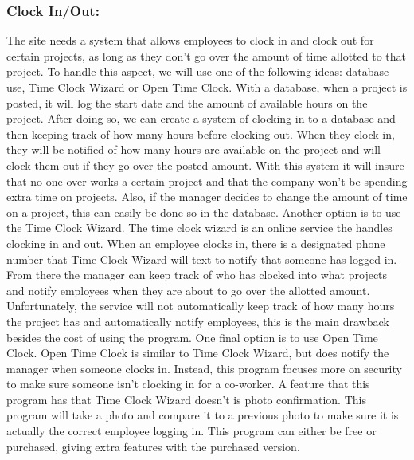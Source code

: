 \documentclass[letterpaper,10pt,titlepage,journal,compsoc,draftclsnofoot,onecolumn]{IEEEtran}
\newcommand\tab[1][1cm]{\hspace*{#1}}
\begin{document}
\subsubsection{Clock In/Out:}
\tab The site needs a system that allows employees to clock in and clock out for certain projects, as long as they don’t go over the amount of time allotted to that project. To handle this aspect, we will use one of the following ideas: database use, Time Clock Wizard or Open Time Clock. \newline\newline\tab With a database, when a project is posted, it will log the start date and the amount of available hours on the project. After doing so, we can create a system of clocking in to a database and then keeping track of how many hours before clocking out. When they clock in, they will be notified of how many hours are available on the project and will clock them out if they go over the posted amount. With this system it will insure that no one over works a certain project and that the company won’t be spending extra time on projects. Also, if the manager decides to change the amount of time on a project, this can easily be done so in the database. \newline\newline\tab Another option is to use the Time Clock Wizard. The time clock wizard is an online service the handles clocking in and out. When an employee clocks in, there is a designated phone number that Time Clock Wizard will text to notify that someone has logged in. From there the manager can keep track of who has clocked into what projects and notify employees when they are about to go over the allotted amount. Unfortunately, the service will not automatically keep track of how many hours the project has and automatically notify employees, this is the main drawback besides the cost of using the program. \newline\newline\tab One final option is to use Open Time Clock. Open Time Clock is similar to Time Clock Wizard, but does notify the manager when someone clocks in. Instead, this program focuses more on security to make sure someone isn’t clocking in for a co-worker. A feature that this program has that Time Clock Wizard doesn’t is photo confirmation. This program will take a photo and compare it to a previous photo to make sure it is actually the correct employee logging in. This program can either be free or purchased, giving extra features with the purchased version. \newline
\end{document}
